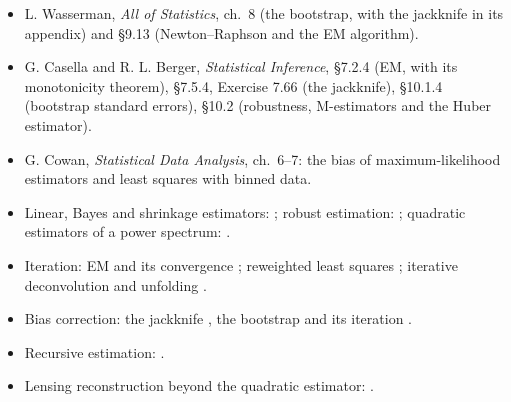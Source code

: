\begin{itemize}[leftmargin=1.2em,itemsep=2pt]
\item L. Wasserman, \emph{All of Statistics}, ch.~8 (the bootstrap, with the
      jackknife in its appendix) and \S9.13 (Newton--Raphson and the EM
      algorithm).
\item G. Casella and R. L. Berger, \emph{Statistical Inference}, \S7.2.4 (EM,
      with its monotonicity theorem), \S7.5.4, Exercise 7.66 (the jackknife),
      \S10.1.4 (bootstrap standard errors), \S10.2 (robustness, M-estimators and
      the Huber estimator).
\item G. Cowan, \emph{Statistical Data Analysis}, ch.~6--7: the bias of
      maximum-likelihood estimators and least squares with binned data.
\item Linear, Bayes and shrinkage estimators: \cite{Stein1956,JamesStein1961,EfronMorris1973,EfronMorris1975,EfronMorris1977};
      robust estimation: \cite{Huber1964,Hampel1974}; quadratic estimators of
      a power spectrum: \cite{Tegmark1997QML}.
\item Iteration: EM \cite{Dempster1977} and its convergence \cite{Wu1983};
      reweighted least squares \cite{HollandWelsch1977,Green1984}; iterative
      deconvolution and unfolding \cite{Richardson1972,Lucy1974,DAgostini1995}.
\item Bias correction: the jackknife \cite{Quenouille1956,Tukey1958}, the
      bootstrap \cite{Efron1979} and its iteration \cite{HallMartin1988}.
\item Recursive estimation: \cite{Welford1962,Kalman1960}.
\item Lensing reconstruction beyond the quadratic estimator:
      \cite{HirataSeljak2003T,HirataSeljak2003P,CarronLewis2017}.
\end{itemize}
  